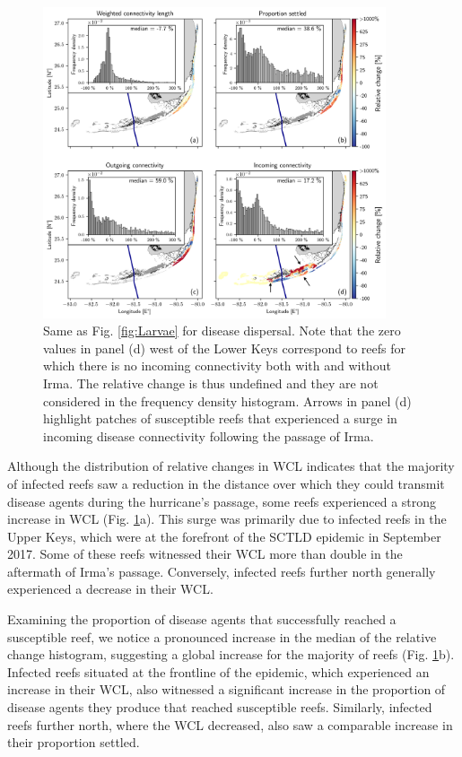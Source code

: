\documentclass[fleqn,10pt]{wlscirep}
\begin{document}
\begin{figure}[tbp]
    \centering
    \includegraphics[width=0.9\textwidth]{figures/fig_connex_sctld_b.png}
    \caption{Same as Fig. \ref{fig:Larvae} for disease dispersal. Note that the zero values in panel (d) west of the Lower Keys correspond to reefs for which there is no incoming connectivity both with and without Irma. The relative change is thus undefined and they are not considered in the frequency density histogram. Arrows in panel (d) highlight patches of susceptible reefs that experienced a surge in incoming disease connectivity following the passage of Irma. }
    \label{fig:SCTLD}
\end{figure}

Although the distribution of relative changes in WCL indicates that the majority of infected reefs saw a reduction in the distance over which they could transmit disease agents during the hurricane's passage, some reefs experienced a strong increase in WCL (Fig. \ref{fig:SCTLD}a). This surge was primarily due to infected reefs in the Upper Keys, which were at the forefront of the SCTLD epidemic in September 2017. Some of these reefs witnessed their WCL more than double in the aftermath of Irma's passage. Conversely, infected reefs further north generally experienced a decrease in their WCL.

Examining the proportion of disease agents that successfully reached a susceptible reef, we notice a pronounced increase in the median of the relative change histogram, suggesting a global increase for the majority of reefs (Fig. \ref{fig:SCTLD}b). Infected reefs situated at the frontline of the epidemic, which experienced an increase in their WCL, also witnessed a significant increase in the proportion of disease agents they produce that reached susceptible reefs. Similarly, infected reefs further north, where the WCL decreased, also saw a comparable increase in their proportion settled.
\end{document}
